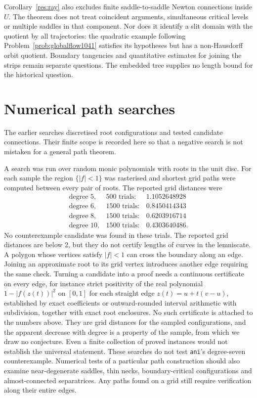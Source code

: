 Corollary~\ref{res:ray} also excludes finite saddle-to-saddle Newton
connections inside $U$. The theorem does not treat coincident arguments,
simultaneous critical levels or multiple saddles in that component. Nor
does it identify a slit domain with the quotient by all trajectories:
the quadratic example following Problem~\ref{prob:globalflow1041} satisfies
its hypotheses but has a non-Hausdorff orbit quotient. Boundary tangencies
and quantitative estimates for joining the strips remain separate questions. The embedded
tree supplies no length bound for the historical question.

\section{Numerical path searches}\label{sec:finite}

The earlier searches discretised root configurations and tested
candidate connections. Their finite scope is recorded here so that a
negative search is not mistaken for a general path theorem.


A search was run over random monic polynomials with roots in the unit disc.  For
each sample the region $\{|f|<1\}$ was rasterised and shortest grid paths were
computed between every pair of roots.  The reported grid distances were
\[
  \begin{array}{lrr}
    \text{degree } 5, & 500 \text{ trials}: & 1.1052648928\\
    \text{degree } 6, & 1500 \text{ trials}: & 0.8450414343\\
    \text{degree } 8, & 1500 \text{ trials}: & 0.6203916714\\
    \text{degree } 10, & 1500 \text{ trials}: & 0.4303640486 .
  \end{array}
\]
No counterexample candidate was found in these trials. The reported
grid distances are below $2$, but they do not certify lengths of curves
in the lemniscate. A polygon whose vertices satisfy $|f|<1$ can cross
the boundary along an edge. Joining an approximate root to its grid
vertex introduces another edge requiring the same check.  Turning a candidate into a proof needs a continuous
certificate on every edge, for instance strict positivity of the real
polynomial $1-|f(z(t))|^2$ on $[0,1]$ for each straight edge $z(t)=u+t(v-u)$,
established by exact coefficients or outward-rounded interval arithmetic with
subdivision, together with exact root enclosures.  No such certificate is
attached to the numbers above.  They are grid distances for the sampled
configurations, and the apparent decrease with degree is a property of the
sample, from which we draw no conjecture.  Even a finite collection of proved instances would not establish
the universal statement. These searches do not test \texttt{ani}'s degree-seven counterexample.
Numerical tests of a particular path construction should also examine
near-degenerate saddles, thin necks, boundary-critical configurations
and almost-connected separatrices. Any paths found on a grid still
require verification along their entire edges.

